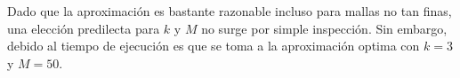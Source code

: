 Dado que la aproximación es bastante razonable incluso para mallas no tan finas, una elección predilecta para $k$ y $M$ no surge por simple inspección. Sin embargo, debido al tiempo de ejecución es que se toma a la aproximación optima con $k = 3$ y $M=50$.



















